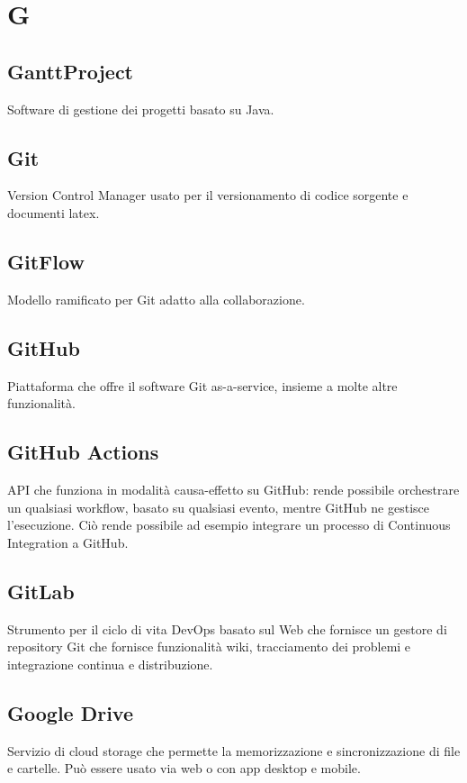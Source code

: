 \newpage
\section{G}
\subsection*{GanttProject}
Software di gestione dei progetti basato su Java.

\subsection*{Git}
Version Control Manager usato per il versionamento di codice sorgente e documenti latex.

\subsection*{GitFlow}
Modello ramificato per Git adatto alla collaborazione.

\subsection*{GitHub}
Piattaforma che offre il software Git as-a-service, insieme a molte altre funzionalità.

\subsection*{GitHub Actions}
API che funziona in modalità causa-effetto su GitHub: rende possibile orchestrare un qualsiasi workflow, basato su qualsiasi evento, mentre GitHub ne gestisce l’esecuzione. Ciò rende possibile ad esempio integrare un processo di Continuous Integration a GitHub.

\subsection*{GitLab}
Strumento per il ciclo di vita DevOps basato sul Web che fornisce un gestore di repository Git che fornisce funzionalità wiki, tracciamento dei problemi e integrazione continua e distribuzione.

\subsection*{Google Drive}
Servizio di cloud storage che permette la memorizzazione e sincronizzazione di file e cartelle. Può essere usato via web o con app desktop e mobile.


